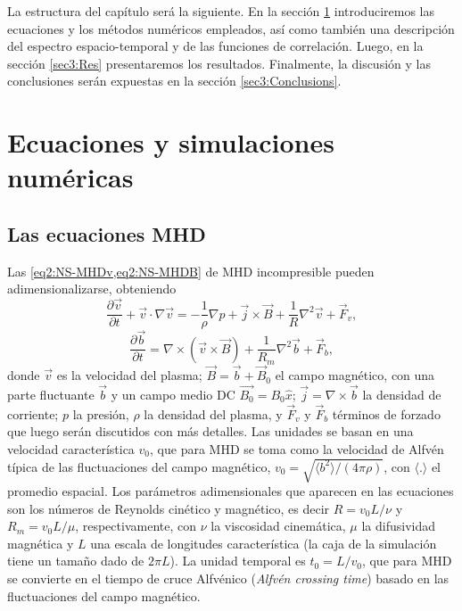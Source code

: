 La estructura del capítulo será la siguiente. En
la sección \ref{sec3:EqNumSim} introduciremos las ecuaciones y los métodos
numéricos empleados, así como también una descripción del espectro
espacio-temporal y de las funciones de correlación. Luego, en
la sección \ref{sec3:Res} presentaremos los resultados. Finalmente, la
discusión y las conclusiones serán expuestas en
la sección \ref{sec3:Conclusions}.

\section{Ecuaciones y simulaciones numéricas}\label{sec3:EqNumSim}

\subsection{Las ecuaciones MHD}\label{sec3:eq}

Las \cref{eq2:NS-MHDv,eq2:NS-MHDB} de MHD incompresible pueden
adimensionalizarse, obteniendo
\begin{equation}\label{eq3:MHD_v}
  \frac {\partial \vec{v}}{\partial t} +
  \vec{v }\cdot \nabla \vec{v} = -\frac{1}{\rho}\nabla p +
  \vec{j} \times \vec{B} + \frac{1}{R} \nabla^2\vec{v} + \vec{F}_v,
\end{equation}
\begin{equation}\label{eq3:MHD_b}
  \frac{\partial \vec{b}}{\partial t} = \nabla \times (\vec{v} \times \vec{B})
  + \frac{1}{R_m} \nabla^2 \vec{b} + \vec{F}_b,
\end{equation}
donde $\vec{v}$ es la velocidad del plasma; $\vec{B} = \vec{b}
+ \vec{B}_0$ el campo magnético, con una parte fluctuante $\vec{b}$ y
un campo medio DC $\vec{B_0}=B_0\hat{x}$; $\vec{j}
= \nabla \times \vec{b}$ la densidad de corriente; $p$ la presión,
$\rho$ la densidad del plasma, y $\vec{F}_v$ y $\vec{F}_b$ términos de
forzado que luego serán discutidos con más detalles. Las unidades se
basan en una velocidad característica $v_0$, que para MHD se toma como
la velocidad de Alfvén típica de las fluctuaciones del campo
magnético, $v_0 = \sqrt{\langle b^2 \rangle /(4\pi\rho)}$, con
$\langle . \rangle$ el promedio espacial. Los parámetros
adimensionales que aparecen en las ecuaciones son los números de
Reynolds cinético y magnético, es decir $R=v_0 L/\nu$ y $R_m = v_0 L
/\mu$, respectivamente, con $\nu$ la viscosidad cinemática, $\mu$ la
difusividad magnética y $L$ una escala de longitudes característica
(la caja de la simulación tiene un tamaño dado de $2\pi L$). La unidad
temporal es $t_0 = L/v_0$, que para MHD se convierte en el tiempo de
cruce Alfv\'enico (\emph{Alfv\'en crossing time}) basado en las
fluctuaciones del campo magnético.


